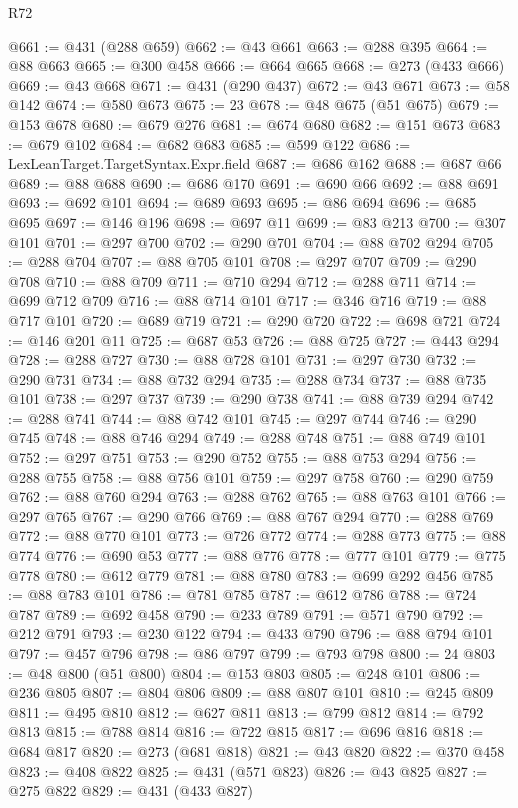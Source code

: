 \begin{lexlean}{R72}
\begin{coremodule}
@661 := @431 (@288 @659)
@662 := @43 @661
@663 := @288 @395
@664 := @88 @663
@665 := @300 @458
@666 := @664 @665
@668 := @273 (@433 @666)
@669 := @43 @668
@671 := @431 (@290 @437)
@672 := @43 @671
@673 := @58 @142
@674 := @580 @673
@675 := 23
@678 := @48 @675 (@51 @675)
@679 := @153 @678
@680 := @679 @276
@681 := @674 @680
@682 := @151 @673
@683 := @679 @102
@684 := @682 @683
@685 := @599 @122
@686 := LexLeanTarget.TargetSyntax.Expr.field
@687 := @686 @162
@688 := @687 @66
@689 := @88 @688
@690 := @686 @170
@691 := @690 @66
@692 := @88 @691
@693 := @692 @101
@694 := @689 @693
@695 := @86 @694
@696 := @685 @695
@697 := @146 @196
@698 := @697 @11
@699 := @83 @213
@700 := @307 @101
@701 := @297 @700
@702 := @290 @701
@704 := @88 @702 @294
@705 := @288 @704
@707 := @88 @705 @101
@708 := @297 @707
@709 := @290 @708
@710 := @88 @709
@711 := @710 @294
@712 := @288 @711
@714 := @699 @712 @709
@716 := @88 @714 @101
@717 := @346 @716
@719 := @88 @717 @101
@720 := @689 @719
@721 := @290 @720
@722 := @698 @721
@724 := @146 @201 @11
@725 := @687 @53
@726 := @88 @725
@727 := @443 @294
@728 := @288 @727
@730 := @88 @728 @101
@731 := @297 @730
@732 := @290 @731
@734 := @88 @732 @294
@735 := @288 @734
@737 := @88 @735 @101
@738 := @297 @737
@739 := @290 @738
@741 := @88 @739 @294
@742 := @288 @741
@744 := @88 @742 @101
@745 := @297 @744
@746 := @290 @745
@748 := @88 @746 @294
@749 := @288 @748
@751 := @88 @749 @101
@752 := @297 @751
@753 := @290 @752
@755 := @88 @753 @294
@756 := @288 @755
@758 := @88 @756 @101
@759 := @297 @758
@760 := @290 @759
@762 := @88 @760 @294
@763 := @288 @762
@765 := @88 @763 @101
@766 := @297 @765
@767 := @290 @766
@769 := @88 @767 @294
@770 := @288 @769
@772 := @88 @770 @101
@773 := @726 @772
@774 := @288 @773
@775 := @88 @774
@776 := @690 @53
@777 := @88 @776
@778 := @777 @101
@779 := @775 @778
@780 := @612 @779
@781 := @88 @780
@783 := @699 @292 @456
@785 := @88 @783 @101
@786 := @781 @785
@787 := @612 @786
@788 := @724 @787
@789 := @692 @458
@790 := @233 @789
@791 := @571 @790
@792 := @212 @791
@793 := @230 @122
@794 := @433 @790
@796 := @88 @794 @101
@797 := @457 @796
@798 := @86 @797
@799 := @793 @798
@800 := 24
@803 := @48 @800 (@51 @800)
@804 := @153 @803
@805 := @248 @101
@806 := @236 @805
@807 := @804 @806
@809 := @88 @807 @101
@810 := @245 @809
@811 := @495 @810
@812 := @627 @811
@813 := @799 @812
@814 := @792 @813
@815 := @788 @814
@816 := @722 @815
@817 := @696 @816
@818 := @684 @817
@820 := @273 (@681 @818)
@821 := @43 @820
@822 := @370 @458
@823 := @408 @822
@825 := @431 (@571 @823)
@826 := @43 @825
@827 := @275 @822
@829 := @431 (@433 @827)

\end{coremodule}
\end{lexlean}
